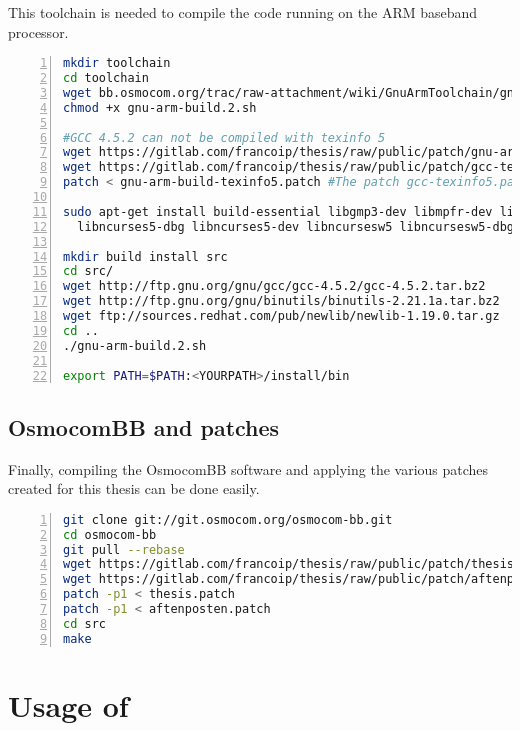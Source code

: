 This toolchain is needed to compile the code running on the ARM baseband
processor.

      \begin{lstlisting}[language=bash, numbers=left,
      basicstyle=\footnotesize, breaklines=true, frame=single]
mkdir toolchain
cd toolchain
wget bb.osmocom.org/trac/raw-attachment/wiki/GnuArmToolchain/gnu-arm-build.2.sh
chmod +x gnu-arm-build.2.sh

#GCC 4.5.2 can not be compiled with texinfo 5
wget https://gitlab.com/francoip/thesis/raw/public/patch/gnu-arm-build-texinfo5.patch
wget https://gitlab.com/francoip/thesis/raw/public/patch/gcc-texinfo5.patch
patch < gnu-arm-build-texinfo5.patch #The patch gcc-texinfo5.patch was adapted from Marcello Pogliani <pogliamarci@hotmail.it>.

sudo apt-get install build-essential libgmp3-dev libmpfr-dev libx11-6 libx11-dev texinfo flex bison libncurses5 \
  libncurses5-dbg libncurses5-dev libncursesw5 libncursesw5-dbg libncursesw5-dev zlibc zlib1g-dev libmpfr4 libmpc-dev

mkdir build install src
cd src/
wget http://ftp.gnu.org/gnu/gcc/gcc-4.5.2/gcc-4.5.2.tar.bz2
wget http://ftp.gnu.org/gnu/binutils/binutils-2.21.1a.tar.bz2
wget ftp://sources.redhat.com/pub/newlib/newlib-1.19.0.tar.gz
cd ..
./gnu-arm-build.2.sh

export PATH=$PATH:<YOURPATH>/install/bin
      \end{lstlisting}
      \iffalse $ \fi

\subsection{OsmocomBB and patches}

Finally, compiling the OsmocomBB software and applying the various
patches created for this thesis can be done easily.

      \begin{lstlisting}[language=bash, numbers=left,
      basicstyle=\footnotesize, breaklines=true, frame=single]
git clone git://git.osmocom.org/osmocom-bb.git
cd osmocom-bb
git pull --rebase
wget https://gitlab.com/francoip/thesis/raw/public/patch/thesis.patch
wget https://gitlab.com/francoip/thesis/raw/public/patch/aftenposten.patch
patch -p1 < thesis.patch
patch -p1 < aftenposten.patch
cd src
make
      \end{lstlisting}

\section{Usage of }

